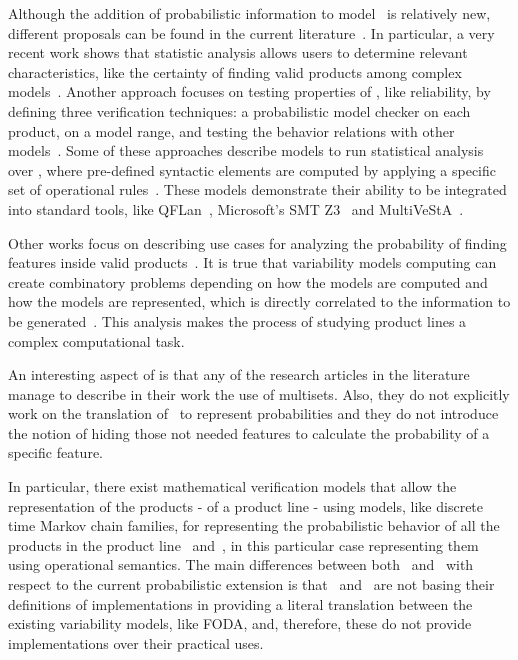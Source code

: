 Although the addition of probabilistic information to model \SPLs\ is relatively new, different proposals can be found in the current literature~\cite{chssgl13,tllv15,tlll15,dpcslsh17}. In particular, a very recent
work shows that statistic analysis allows users to determine relevant characteristics, like the certainty of finding valid products among complex models~\cite{dpcslsh17}.
%
Another approach focuses on testing properties of \SPLs, like reliability, by defining three verification techniques: a probabilistic model checker on each product, on a model range, and testing the behavior relations with other models~\cite{chssgl13}.
%
Some of these approaches describe models to run statistical analysis over \SPLs, where pre-defined syntactic elements are computed by applying a specific set of operational rules~\cite{tllv15,tlll15}. These models demonstrate their ability to be integrated into standard tools, like QFLan~\cite{tlll15}, Microsoft's SMT Z3~\cite{ln08} and MultiVeStA~\cite{sa13}.
%
%

Other works focus on describing use cases for analyzing the probability of finding features inside valid products~\cite{dpcslsh17}.
It is true that variability models computing can create combinatory problems
depending on how the models are computed and how the models are represented, which is directly
correlated to the information to be generated~\cite{dpcslsh17}.
This analysis makes the process of studying product lines a complex computational  task.

An interesting aspect of \fodaPAp is that
any of the research articles in the literature manage
to describe in their work the use of multisets.
Also, they do not explicitly work on
the translation of \FODA\ to represent probabilities and they do
not introduce the notion of hiding those not needed features to
calculate the probability of a specific feature.
%
%
%
%
%




In particular, there exist mathematical verification models that allow the representation of the products - of a product line - using models, like discrete time Markov chain families, for representing the probabilistic behavior of all the products in the product line~\cite{Dubslaff2015} and~\cite{vk13}, in this particular case representing them using operational semantics.
%
The main differences between both~\cite{Dubslaff2015} and~\cite{vk13} with respect to the current probabilistic extension is that~\cite{Dubslaff2015} and~\cite{vk13} are not basing their definitions of implementations in providing a literal translation between the existing variability models, like FODA, and, therefore, these do not provide implementations over their practical uses.

